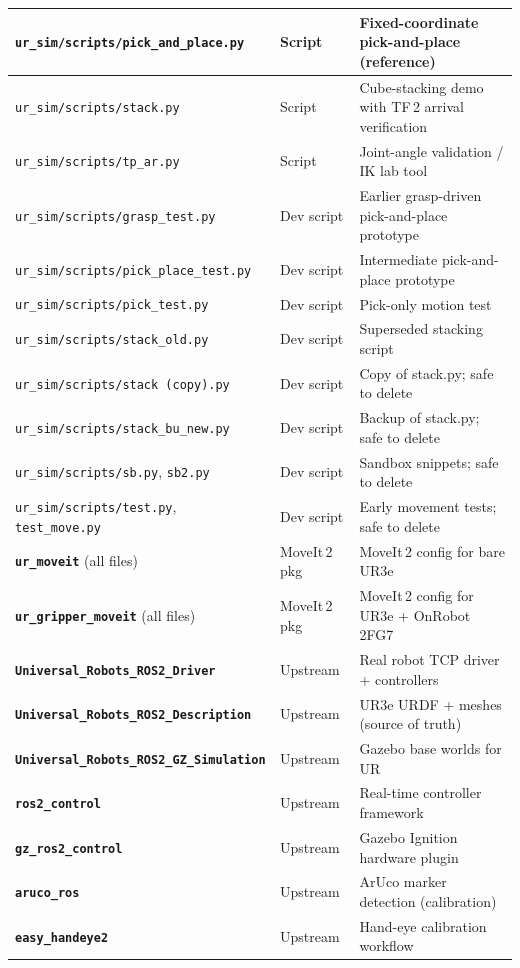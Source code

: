 \documentclass[11pt,a4paper]{article}
\newcommand{\pkg}[1]{\texttt{\textbf{#1}}}
\newcommand{\file}[1]{\texttt{#1}}
\begin{document}
\begin{longtable}{|p{5cm}|p{2.5cm}|p{7cm}|}
\hline
\file{ur\_sim/scripts/pick\_and\_place.py} & Script & Fixed-coordinate pick-and-place (reference) \\
\hline
\file{ur\_sim/scripts/stack.py} & Script & Cube-stacking demo with TF\,2 arrival verification \\
\hline
\file{ur\_sim/scripts/tp\_ar.py} & Script & Joint-angle validation / IK lab tool \\
\hline
\file{ur\_sim/scripts/grasp\_test.py} & Dev script & Earlier grasp-driven pick-and-place prototype \\
\hline
\file{ur\_sim/scripts/pick\_place\_test.py} & Dev script & Intermediate pick-and-place prototype \\
\hline
\file{ur\_sim/scripts/pick\_test.py} & Dev script & Pick-only motion test \\
\hline
\file{ur\_sim/scripts/stack\_old.py} & Dev script & Superseded stacking script \\
\hline
\file{ur\_sim/scripts/stack (copy).py} & Dev script & Copy of stack.py; safe to delete \\
\hline
\file{ur\_sim/scripts/stack\_bu\_new.py} & Dev script & Backup of stack.py; safe to delete \\
\hline
\file{ur\_sim/scripts/sb.py}, \file{sb2.py} & Dev script & Sandbox snippets; safe to delete \\
\hline
\file{ur\_sim/scripts/test.py}, \file{test\_move.py} & Dev script & Early movement tests; safe to delete \\
\hline
\pkg{ur\_moveit} (all files) & MoveIt\,2 pkg & MoveIt\,2 config for bare UR3e \\
\hline
\pkg{ur\_gripper\_moveit} (all files) & MoveIt\,2 pkg & MoveIt\,2 config for UR3e + OnRobot 2FG7 \\
\hline
\pkg{Universal\_Robots\_ROS2\_Driver} & Upstream & Real robot TCP driver + controllers \\
\hline
\pkg{Universal\_Robots\_ROS2\_Description} & Upstream & UR3e URDF + meshes (source of truth) \\
\hline
\pkg{Universal\_Robots\_ROS2\_GZ\_Simulation} & Upstream & Gazebo base worlds for UR \\
\hline
\pkg{ros2\_control} & Upstream & Real-time controller framework \\
\hline
\pkg{gz\_ros2\_control} & Upstream & Gazebo Ignition hardware plugin \\
\hline
\pkg{aruco\_ros} & Upstream & ArUco marker detection (calibration) \\
\hline
\pkg{easy\_handeye2} & Upstream & Hand-eye calibration workflow \\

\end{longtable}
\end{document}
